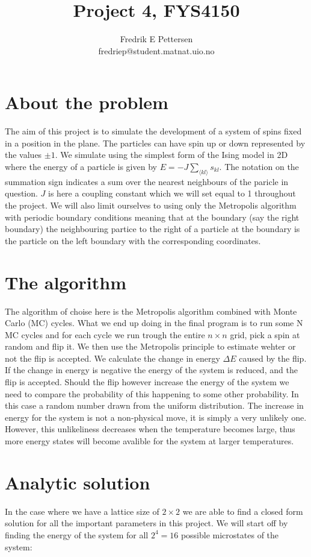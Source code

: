 \documentclass[a4paper,english, 10pt, twoside]{article}
\title{Project 4, FYS4150}
\author{Fredrik E Pettersen\\ fredriep@student.matnat.uio.no}
\begin{document}
\maketitle


\section*{About the problem}
The aim of this project is to simulate the development of a system of spins fixed in a position in the plane. The particles can 
have spin up or down represented by the values $\pm 1$. We simulate using the simplest form of the Ising model in 2D where the energy 
of a particle is given by $E = -J\sum\limits_{\langle kl\rangle}s_{kl}$. The notation on the summation sign indicates a sum over the 
nearest neighbours of the paricle in question. $J$ is here a coupling constant which we will set equal to 1 throughout the project. 
We will also limit ourselves to using only the Metropolis algorithm with periodic boundary conditions meaning that at the boundary 
(say the right boundary) the neighbouring partice to the right of a particle at the boundary is the particle on the left boundary 
with the corresponding coordinates.

\section*{The algorithm}
The algorithm of choise here is the Metropolis algorithm combined with Monte Carlo (MC) cycles. What we end up doing in the final 
program is to run some N MC cycles and for each cycle we run trough the entire $n \times n$ grid, pick a spin at random and flip 
it. We then use the Metropolis principle to estimate wehter or not the flip is accepted. We calculate the change in energy 
$\Delta E$ caused by the flip. If the change in energy is negative the energy of the system is reduced, and the flip is accepted. 
Should the flip however increase the energy of the system we need to compare the probability of this happening to some other 
probability. In this case a random number drawn from the uniform distribution. The increase in energy for the system is not a 
non-physical move, it is simply a very unlikely one. However, this unlikeliness decreases when the temperature becomes large, 
thus more energy states will become avalible for the system at larger temperatures.

\section*{Analytic solution}
In the case where we have a lattice size of $2\times2$ we are able to find a closed form solution for all the important parameters 
in this project. We will start off by finding the energy of the system for all $2^4 = 16$ possible microstates of the system:
 
\end{document}
